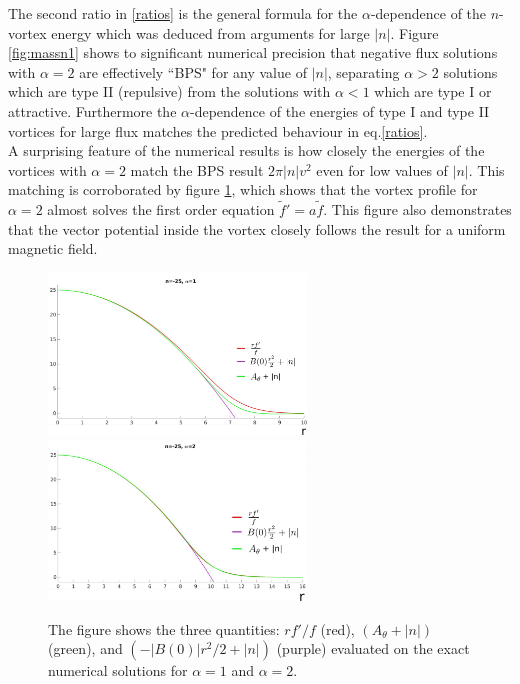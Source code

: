 The second ratio in \eqref{ratios} is the general formula for the $\alpha$-dependence of the $n$-vortex energy which was deduced from arguments for large $|n|$. Figure \ref{fig:massn1} shows to significant numerical precision that negative flux solutions with $\alpha=2$ are effectively ``BPS" for any value of  $|n|$, separating $\alpha> 2$ solutions which are type II (repulsive) from the solutions with $\alpha < 1$ which are type I or attractive. Furthermore the $\alpha$-dependence of the energies of type I and type II vortices for large flux matches the predicted behaviour in eq.\eqref{ratios}. \\
\indent A surprising feature of the numerical results is how closely the energies of the vortices with $\alpha=2$  match the BPS result $2\pi |n| v^2$ even for low values of $|n|$. This matching is corroborated by  figure \ref{fig:firstorder}, which shows that the vortex profile for $\alpha=2$  almost solves the first order equation $\tilde f' = a \tilde f$. This figure also demonstrates that the vector potential inside the vortex closely follows the result for a uniform magnetic field.
\begin{figure}[H]
\begin{center}
    \includegraphics[width=2.70in]{Chapter_2_Folder_1912.11321/figures/firstorderalpha1_corrected.pdf} \hspace{0.1in}
      \includegraphics[width=2.7in]{Chapter_2_Folder_1912.11321/figures/firstorderalpha2_corrected.pdf} 
    \caption[This figure shows three quantities that ought to match in the BPS vortex.]{{\small The figure shows the three quantities: $rf'/f$ (red), $\left(A_\theta+|n|\right)$ (green), and $\left(-|B(0)|r^2/2+|n|\right)$ (purple) evaluated on the exact numerical solutions for $\alpha=1$ and $\alpha=2$.}} \label{fig:firstorder}
    \end{center}
\end{figure}
